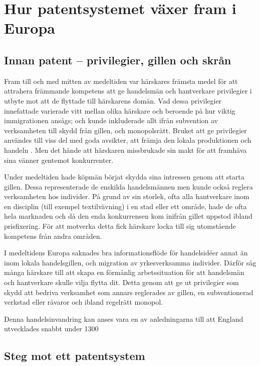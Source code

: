 \section{Hur patentsystemet växer fram i Europa}
\label{sec:med}

\subsection{Innan patent -- privilegier, gillen och skrån} %
\label{sub:innan_patent_systemet}

Fram till och med mitten av medeltiden var härskares främsta medel för att
attrahera främmande kompetens att ge handelsmän och hantverkare privilegier i
utbyte mot att de flyttade till härskarens domän. 
Vad dessa privilegier innefattade varierade vitt mellan olika härskare och
beroende på hur viktig immigrationen ansågs; och kunde inkluderade allt ifrån
subvention av verksamheten till skydd från gillen, och monopolsrätt. 
Bruket att ge privilegier användes till viss del med goda avsikter, att främja
den lokala produktionen och handeln \cite{nard}. Men det hände att härskaren
missbrukade sin makt för att framhäva sina vänner gentemot konkurrenter.

Under medeltiden hade köpmän börjat skydda sina intressen genom att starta
gillen. 
Dessa representerade de enskilda handelsmännen men kunde också reglera
verksamheten hos individer.
På grund av sin storlek, ofta alla hantverkare inom en disciplin (till exempel
textilvävning) i en stad eller ett område, hade de ofta hela marknaden och då
den enda konkurrensen kom inifrån gillet uppstod ibland prisfixering. 
För att motverka detta fick härskare locka till sig utomstående kompetens från
andra områden.

I medeltidens Europa saknades bra informationsflöde för handelsidéer annat än
inom lokala handelsgillen, och migration av yrkesverksamma individer. 
Därför såg många härskare till att skapa en förmånlig arbetssituation för att
handelsmän och hantverkare skulle vilja flytta dit. 
Detta genom att ge ut privilegier som skydd att bedriva verksamhet som annars
reglerades av gillen, en subventionerad verkstad eller råvaror och ibland
regelrätt monopol.

Denna handelsinvandring kan anses vara en av anledningarna till att England
utvecklades snabbt under 1300



\subsection{Steg mot ett patentsystem} 


